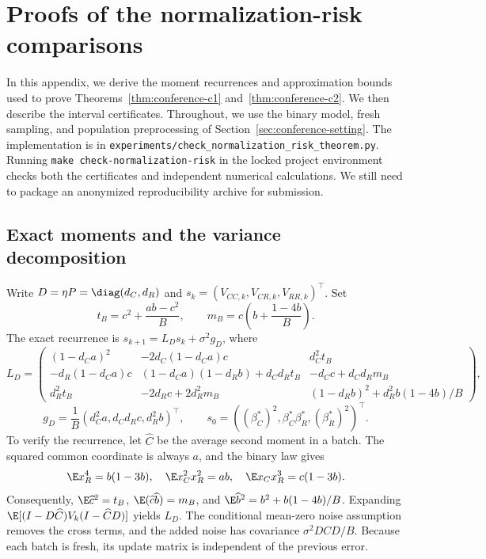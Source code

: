 \section{Proofs of the normalization-risk comparisons}
\label{sec:comparison-proofs}

In this appendix, we derive the moment recurrences and approximation bounds used
to prove Theorems~\ref{thm:conference-c1} and~\ref{thm:conference-c2}. We then
describe the interval certificates. Throughout, we use the binary model, fresh
sampling, and population preprocessing of Section~\ref{sec:conference-setting}.
The implementation is in
\texttt{experiments/check\_normalization\_risk\_theorem.py}. Running
\texttt{make check-normalization-risk} in the locked project environment checks
both the certificates and independent numerical calculations. We still need to
package an anonymized reproducibility archive for submission.

\subsection{Exact moments and the variance decomposition}

Write $D = \eta P = \diag(d_C,d_R)$ and
$s_k = (V_{CC,k},V_{CR,k},V_{RR,k})^\top$. Set
\[
 t_B = c^2 + \frac{ab - c^2}{B},\qquad m_B
     = c\left( b + \frac{1 - 4b}{B} \right).
\]
The exact recurrence is $s_{k+1} = L_Ds_k + \sigma^2g_D$, where
\[
 L_D
 = \begin{pmatrix}
    (1 - d_Ca)^2    & -2d_C(1 - d_Ca)c                 & d_C^2t_B                        \\
    -d_R(1 - d_Ca)c & (1 - d_Ca)(1 - d_Rb) + d_Cd_Rt_B & -d_Cc + d_Cd_Rm_B               \\
    d_R^2t_B        & -2d_Rc + 2d_R^2m_B               & (1 - d_Rb)^2 + d_R^2b(1 - 4b)/B
   \end{pmatrix},
\]
\[
 g_D = \frac1B(d_C^2a,d_Cd_Rc,d_R^2b)^\top,\qquad s_0
     = ((\beta_C^*)^2,\beta_C^*\beta_R^*,(\beta_R^*)^2)^\top.
\]
To verify the recurrence, let $\widehat C$ be the average second moment in a
batch. The squared common coordinate is always $a$, and the binary law gives
\[
 \E x_R^4 = b(1 - 3b),\quad \E x_C^2x_R^2 = ab,\quad \E x_Cx_R^3 = c(1 - 3b).
\]
Consequently, $\E\widehat c^2 = t_B$, $\E(\widehat c\widehat b) = m_B$, and
$\E\widehat b^2 = b^2 + b(1 - 4b)/B$. Expanding
$\E[(I-D\widehat C)V_k(I-\widehat CD)]$ yields $L_D$. The conditional mean-zero
noise assumption removes the cross terms, and the added noise has covariance
$\sigma^2DCD/B$. Because each batch is fresh, its update matrix is independent
of the previous error.

